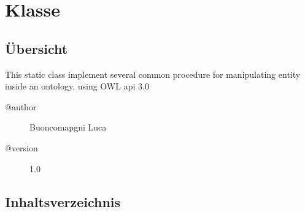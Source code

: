 
\section[OWLLibrary]{Klasse }\label{ontologyFramework.OFContextManagement.OWLLibrary-class}
\subsection{Übersicht}
This static class implement several common procedure
 for manipulating entity inside an ontology, using
 OWL api 3.0
\begin{description}
\item[@author] 
Buoncomapgni Luca
\item[@version] 
1.0
\end{description}
\subsection{Inhaltsverzeichnis}
